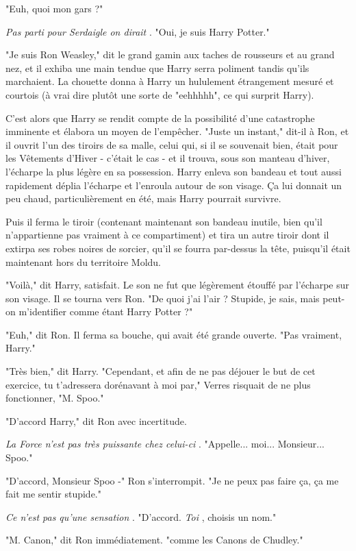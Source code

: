 "Euh, quoi mon gars ?"

\emph{Pas parti pour Serdaigle on dirait} . "Oui, je suis Harry Potter."

"Je suis Ron Weasley," dit le grand gamin aux taches de rousseurs et au grand nez, et il exhiba une main tendue que Harry serra poliment tandis qu'ils marchaient. La chouette donna à Harry un hululement étrangement mesuré et courtois (à vrai dire plutôt une sorte de "eehhhhh", ce qui surprit Harry).

C'est alors que Harry se rendit compte de la possibilité d'une catastrophe imminente et élabora un moyen de l'empêcher. "Juste un instant," dit-il à Ron, et il ouvrit l'un des tiroirs de sa malle, celui qui, si il se souvenait bien, était pour les Vêtements d'Hiver - c'était le cas - et il trouva, sous son manteau d'hiver, l'écharpe la plus légère en sa possession. Harry enleva son bandeau et tout aussi rapidement déplia l'écharpe et l'enroula autour de son visage. Ça lui donnait un peu chaud, particulièrement en été, mais Harry pourrait survivre.

Puis il ferma le tiroir (contenant maintenant son bandeau inutile, bien qu'il n'appartienne pas vraiment à ce compartiment) et tira un autre tiroir dont il extirpa ses robes noires de sorcier, qu'il se fourra par-dessus la tête, puisqu'il était maintenant hors du territoire Moldu.

"Voilà," dit Harry, satisfait. Le son ne fut que légèrement étouffé par l'écharpe sur son visage. Il se tourna vers Ron. "De quoi j'ai l'air ? Stupide, je sais, mais peut-on m'identifier comme étant Harry Potter ?"

"Euh," dit Ron. Il ferma sa bouche, qui avait été grande ouverte. "Pas vraiment, Harry."

"Très bien," dit Harry. "Cependant, et afin de ne pas déjouer le but de cet exercice, tu t'adressera dorénavant à moi par," Verres risquait de ne plus fonctionner, "M. Spoo."

"D'accord Harry," dit Ron avec incertitude.

\emph{La Force n'est pas très puissante chez celui-ci} . "Appelle... moi... Monsieur... Spoo."

"D'accord, Monsieur Spoo -" Ron s'interrompit. "Je ne peux pas faire ça, ça me fait me sentir stupide."

\emph{Ce n'est pas qu'une sensation} . "D'accord. \emph{Toi} , choisis un nom."

"M. Canon," dit Ron immédiatement. "comme les Canons de Chudley."

